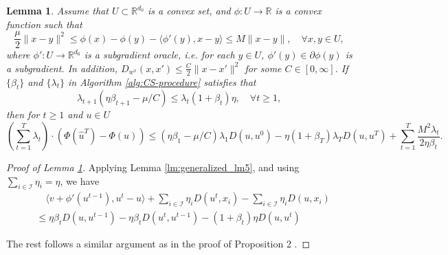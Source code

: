 \documentclass[10pt]{article}
\newcommand{\mc}{\mathcal}
\newcommand{\R}{\mathbb{R}}
\newtheorem{lemma}{Lemma}[section]
\begin{document}
\begin{lemma}\label{lm:modified_prop2}
Assume that $U\subset \R^{d_0}$ is a convex set, and $\phi:U\to \R$ is a convex function such that 
\begin{displaymath}
    \frac{\mu}{2}\|x-y\|^2\leq \phi(x) - \phi(y)-\langle \phi'(y),x-y\rangle\leq M\|x-y\|,\quad\forall x,y\in U,
\end{displaymath}
where $\phi':U\to \R^{d_0}$ is a subgradient oracle, i.e. for each $y\in U$, $\phi'(y)\in \partial \phi(y)$ is a subgradient. In addition, $D_{w^x}(x,x')\leq \frac{C}{2}\|x-x'\|^2$ for some $C\in [0,\infty]$. If $\{\beta_t\}$ and $\{\lambda_t\}$ in Algorithm \ref{alg:CS-procedure} satisfies that 
    \begin{displaymath}
        \lambda_{t+1} (\eta\beta_{t+1}-\mu/C) \leq \lambda_t(1+\beta_t)\eta,\quad \forall t\geq 1,
    \end{displaymath}
    then for $t\geq 1$ and $u\in U$
    \begin{displaymath}
        (\sum_{t=1}^T \lambda_t)\cdot(\Phi(\widehat{u}^T) - \Phi(u))\leq (\eta\beta_1-\mu/C)\lambda_1D(u,u^0)  - \eta(1+\beta_T)\lambda_TD(u,u^T)+\sum_{t=1}^T \frac{M^2\lambda_t}{2\eta\beta_t}.
    \end{displaymath}
\end{lemma}
\begin{proof}[Proof of Lemma \ref{lm:modified_prop2}]
    
Applying Lemma \ref{lm:generalized_lm5}, and using $\sum_{i\in \mc I}\eta_i = \eta$, we have
\begin{align*}
    &\quad \langle v+\phi'(u^{t-1}),u^{t}-u\rangle + \sum_{i\in \mc I}\eta_iD(u^t,x_i)  - \sum_{i\in \mc I}\eta_iD(u,x_i) \\
    &\leq \eta \beta_tD(u,u^{t-1}) -\eta \beta_tD(u^t,u^{t-1})-(1+\beta_t)\eta D(u,u^t)
\end{align*}

The rest follows a similar argument as in the proof of Proposition 2 \cite{lan_communication-efficient_2020}. 

\end{proof}
\end{document}
